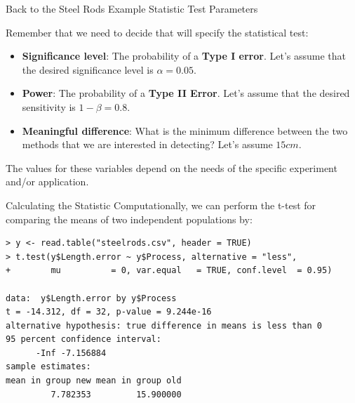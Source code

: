 \begin{frame}
{Back to the Steel Rods Example}
{Statistic Test Parameters}

  Remember that we need to decide  that will specify the statistical test:

  \begin{itemize}
    \item {\bf Significance level}: The probability of a {\bf Type I error}. Let's assume that the desired significance level is $\alpha = 0.05$.\bigskip

    \item {\bf Power}: The probability of a {\bf Type II Error}. Let's assume that the desired sensitivity is $1 - \beta = 0.8$.\bigskip

    \item {\bf Meaningful difference}: What is the minimum difference between the two methods that we are interested in detecting? Let's assume $15cm$.
  \end{itemize}\bigskip

The values for these variables depend on the needs of the specific experiment and/or application.

\end{frame}


\begin{frame}[fragile]{Calculating the Statistic}
Computationally, we can perform the t-test for comparing the means of two independent populations by:
\bigskip
{\smaller
\begin{verbatim}
> y <- read.table("steelrods.csv", header = TRUE)
> t.test(y$Length.error ~ y$Process, alternative = "less",
+        mu          = 0, var.equal   = TRUE, conf.level  = 0.95)

data:  y$Length.error by y$Process
t = -14.312, df = 32, p-value = 9.244e-16
alternative hypothesis: true difference in means is less than 0
95 percent confidence interval:
      -Inf -7.156884
sample estimates:
mean in group new mean in group old
         7.782353         15.900000
\end{verbatim}}
\end{frame}


